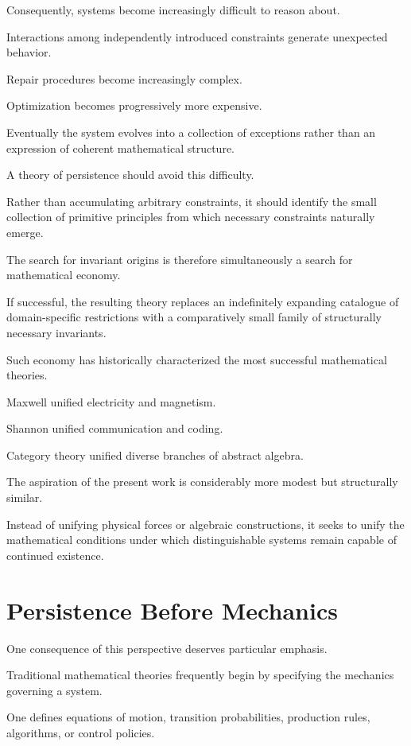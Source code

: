 \documentclass[11pt]{book}
\numberwithin{equation}{chapter}
\theoremstyle{definition}
\theoremstyle{plain}
\begin{document}
Consequently, systems become increasingly difficult to reason about.

Interactions among independently introduced constraints generate unexpected behavior.

Repair procedures become increasingly complex.

Optimization becomes progressively more expensive.

Eventually the system evolves into a collection of exceptions rather than an expression of coherent mathematical structure.

A theory of persistence should avoid this difficulty.

Rather than accumulating arbitrary constraints, it should identify the small collection of primitive principles from which necessary constraints naturally emerge.

The search for invariant origins is therefore simultaneously a search for mathematical economy.

If successful, the resulting theory replaces an indefinitely expanding catalogue of domain-specific restrictions with a comparatively small family of structurally necessary invariants.

Such economy has historically characterized the most successful mathematical theories.

Maxwell unified electricity and magnetism.

Shannon unified communication and coding.

Category theory unified diverse branches of abstract algebra.

The aspiration of the present work is considerably more modest but structurally similar.

Instead of unifying physical forces or algebraic constructions, it seeks to unify the mathematical conditions under which distinguishable systems remain capable of continued existence.

\section{Persistence Before Mechanics}

One consequence of this perspective deserves particular emphasis.

Traditional mathematical theories frequently begin by specifying the mechanics governing a system.

One defines equations of motion, transition probabilities, production rules, algorithms, or control policies.
\end{document}

